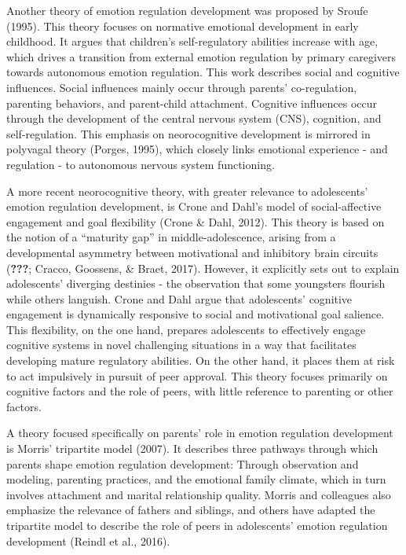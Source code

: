 \documentclass[
  english,
  man]{apa6}
\begin{document}
Another theory of emotion regulation development was proposed by Sroufe (1995). This theory focuses on normative emotional development in early childhood. It argues that children's self-regulatory abilities increase with age, which drives a transition from external emotion regulation by primary caregivers towards autonomous emotion regulation. This work describes social and cognitive influences. Social influences mainly occur through parents' co-regulation, parenting behaviors, and parent-child attachment. Cognitive influences occur through the development of the central nervous system (CNS), cognition, and self-regulation. This emphasis on neorocognitive development is mirrored in polyvagal theory (Porges, 1995), which closely links emotional experience - and regulation - to autonomous nervous system functioning.

A more recent neorocognitive theory, with greater relevance to adolescents' emotion regulation development, is Crone and Dahl's model of social-affective engagement and goal flexibility (Crone \& Dahl, 2012). This theory is based on the notion of a \enquote{maturity gap} in middle-adolescence, arising from a developmental asymmetry between motivational and inhibitory brain circuits ({\textbf{???}}; Cracco, Goossens, \& Braet, 2017). However, it explicitly sets out to explain adolescents' diverging destinies - the observation that some youngsters flourish while others languish. Crone and Dahl argue that adolescents' cognitive engagement is dynamically responsive to social and motivational goal salience. This flexibility, on the one hand, prepares adolescents to effectively engage cognitive systems in novel challenging situations in a way that facilitates developing mature regulatory abilities. On the other hand, it places them at risk to act impulsively in pursuit of peer approval. This theory focuses primarily on cognitive factors and the role of peers, with little reference to parenting or other factors.

A theory focused specifically on parents' role in emotion regulation development is Morris' tripartite model (2007). It describes three pathways through which parents shape emotion regulation development: Through observation and modeling, parenting practices, and the emotional family climate, which in turn involves attachment and marital relationship quality. Morris and colleagues also emphasize the relevance of fathers and siblings, and others have adapted the tripartite model to describe the role of peers in adolescents' emotion regulation development (Reindl et al., 2016).
\end{document}
